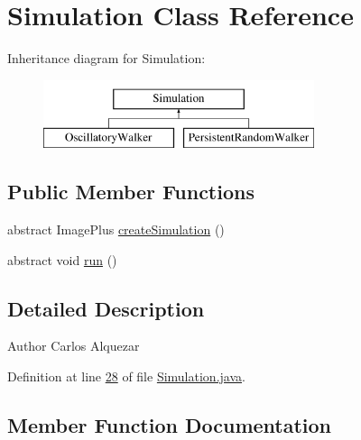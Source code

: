 \hypertarget{classdata_1_1_simulation}{}\section{Simulation Class Reference}
\label{classdata_1_1_simulation}
Inheritance diagram for Simulation\+:\begin{figure}[H]
\begin{center}
\leavevmode
\includegraphics[height=2.000000cm]{classdata_1_1_simulation}
\end{center}
\end{figure}
\subsection*{Public Member Functions}
\begin{DoxyCompactItemize}
\item 
abstract Image\+Plus \hyperlink{classdata_1_1_simulation_a7fdb72bfe49073e67efb68abd6f58ac4}{create\+Simulation} ()
\item 
abstract void \hyperlink{classdata_1_1_simulation_ad68e8feb22b9629629b377701c6ef3e7}{run} ()
\end{DoxyCompactItemize}


\subsection{Detailed Description}
\begin{DoxyAuthor}{Author}
Carlos Alquezar 
\end{DoxyAuthor}


Definition at line \hyperlink{_simulation_8java_source_l00028}{28} of file \hyperlink{_simulation_8java_source}{Simulation.\+java}.



\subsection{Member Function Documentation}
\hypertarget{classdata_1_1_simulation_a7fdb72bfe49073e67efb68abd6f58ac4}{}\label{classdata_1_1_simulation_a7fdb72bfe49073e67efb68abd6f58ac4} 
